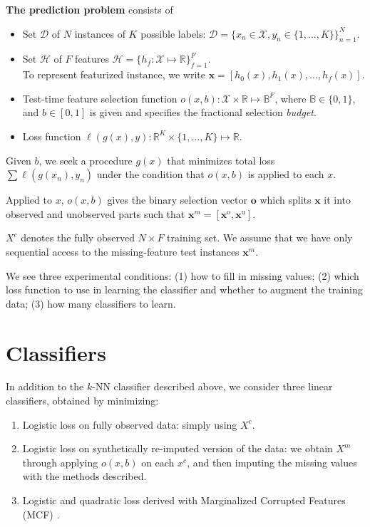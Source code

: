 \begin{mydef} \label{def:problem}
\textbf{The prediction problem} consists of
\begin{itemize}
\item Set $\mathcal{D}$ of $N$ instances of $K$ possible labels: $\mathcal{D} = \{x_n \in \mathcal{X}, y_n \in \{1, \dots, K\}\}_{n=1}^N$.

\item Set $\mathcal{H}$ of $F$ features $\mathcal{H} = \{h_f : \mathcal{X} \mapsto \mathbb{R} \}_{f=1}^F$.\\
To represent featurized instance, we write $\mathbf{x} = [h_0(x), h_1(x), \dots, h_f(x)]$.

\item Test-time feature selection function $o(x, b): \mathcal{X} \times \mathbb{R} \mapsto \mathbb{B}^F$, where $\mathbb{B} \in \{0, 1\}$, and $b \in [0, 1]$ is given and specifies the fractional selection \emph{budget}.

\item Loss function $\ell(g(x), y): \mathbb{R}^K \times \{1, \dots, K\} \mapsto \mathbb{R}$.
\end{itemize}

Given $b$, we seek a procedure $g(x)$ that minimizes total loss $\sum \ell(g(x_n), y_n)$ under the condition that $o(x, b)$ is applied to each $x$.
\end{mydef}

Applied to $x$, $o(x, b)$ gives the binary selection vector $\mathbf{o}$ which splits $\mathbf{x}$ it into observed and unobserved parts such that $\mathbf{x}^m = [\mathbf{x}^\text{o}, \mathbf{x}^\text{u}]$.

$X^c$ denotes the fully observed $N \times F$ training set.
We assume that we have only sequential access to the missing-feature test instances $\mathbf{x}^m$.

We see three experimental conditions: (1) how to fill in missing values; (2) which loss function to use in learning the classifier and whether to augment the training data; (3) how many classifiers to learn.


\section{Classifiers}

In addition to the $k$-NN classifier described above, we consider three linear classifiers, obtained by minimizing:
\begin{enumerate}
  \item Logistic loss on fully observed data: simply using $X^c$.
  \item Logistic loss on synthetically re-imputed version of the data: we obtain $X^m$ through applying $o(x, b)$ on each $x^c$, and then imputing the missing values with the methods described.
  \item Logistic and quadratic loss derived with Marginalized Corrupted Features (MCF) \cite{Maaten-ICML-2013}.
\end{enumerate}

